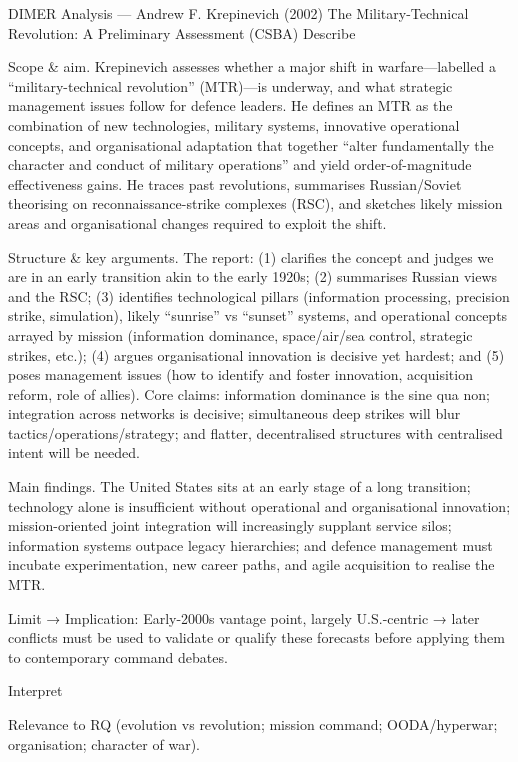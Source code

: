 DIMER Analysis — Andrew F. Krepinevich (2002) The Military-Technical Revolution: A Preliminary Assessment (CSBA)
Describe

Scope & aim. Krepinevich assesses whether a major shift in warfare—labelled a “military-technical revolution” (MTR)—is underway, and what strategic management issues follow for defence leaders. He defines an MTR as the combination of new technologies, military systems, innovative operational concepts, and organisational adaptation that together “alter fundamentally the character and conduct of military operations” and yield order-of-magnitude effectiveness gains. He traces past revolutions, summarises Russian/Soviet theorising on reconnaissance-strike complexes (RSC), and sketches likely mission areas and organisational changes required to exploit the shift.

Structure & key arguments. The report: (1) clarifies the concept and judges we are in an early transition akin to the early 1920s; (2) summarises Russian views and the RSC; (3) identifies technological pillars (information processing, precision strike, simulation), likely “sunrise” vs “sunset” systems, and operational concepts arrayed by mission (information dominance, space/air/sea control, strategic strikes, etc.); (4) argues organisational innovation is decisive yet hardest; and (5) poses management issues (how to identify and foster innovation, acquisition reform, role of allies). Core claims: information dominance is the sine qua non; integration across networks is decisive; simultaneous deep strikes will blur tactics/operations/strategy; and flatter, decentralised structures with centralised intent will be needed.

Main findings. The United States sits at an early stage of a long transition; technology alone is insufficient without operational and organisational innovation; mission-oriented joint integration will increasingly supplant service silos; information systems outpace legacy hierarchies; and defence management must incubate experimentation, new career paths, and agile acquisition to realise the MTR.

Limit → Implication: Early-2000s vantage point, largely U.S.-centric → later conflicts must be used to validate or qualify these forecasts before applying them to contemporary command debates.

Interpret

Relevance to RQ (evolution vs revolution; mission command; OODA/hyperwar; organisation; character of war).

